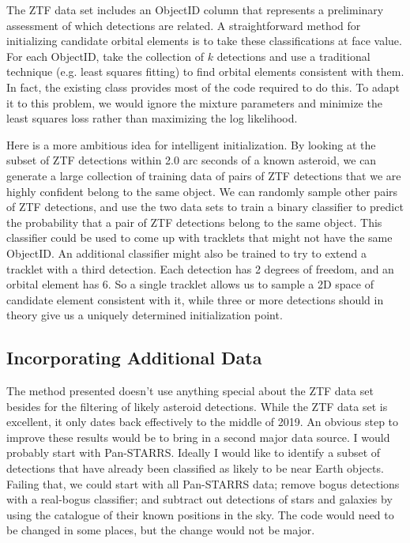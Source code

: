 The ZTF data set includes an ObjectID column that represents a preliminary assessment of which detections are related.
A straightforward method for initializing candidate orbital elements is to take these classifications at face value.
For each ObjectID, take the collection of $k$ detections and use a traditional technique (e.g. least squares fitting) to find orbital elements consistent with them.
In fact, the existing  class provides most of the code required to do this.
To adapt it to this problem, we would ignore the mixture parameters and minimize the least squares loss rather than maximizing the log likelihood.

Here is a more ambitious idea for intelligent initialization.
By looking at the subset of ZTF detections within 2.0 arc seconds of a known asteroid, we can generate a large collection of training data
of pairs of ZTF detections that we are highly confident belong to the same object.
We can randomly sample other pairs of ZTF detections, and use the two data sets to train a binary classifier to predict 
the probability that a pair of ZTF detections belong to the same object.
This classifier could be used to come up with tracklets that might not have the same ObjectID.
An additional classifier might also be trained to try to extend a tracklet with a third detection.
Each detection has 2 degrees of freedom, and an orbital element has 6.
So a single tracklet allows us to sample a 2D space of candidate element consistent with it,
while three or more detections should in theory give us a uniquely determined initialization point.

\subsection{Incorporating Additional Data}
The method presented doesn't use anything special about the ZTF data set besides for the filtering of likely asteroid detections.
While the ZTF data set is excellent, it only dates back effectively to the middle of 2019.
An obvious step to improve these results would be to bring in a second major data source.
I would probably start with Pan-STARRS.
Ideally I would like to identify a subset of detections that have already been classified as likely to be near Earth objects.
Failing that, we could start with all Pan-STARRS data; remove bogus detections with a real-bogus classifier;
and subtract out detections of stars and galaxies by using the catalogue of their known positions in the sky.
The code would need to be changed in some places, but the change would not be major.

